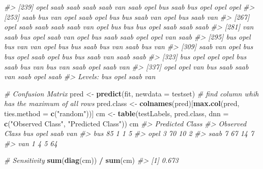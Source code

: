\documentclass[]{book}
\newenvironment{Shaded}{\begin{snugshade}}{\end{snugshade}}
\newcommand{\CommentTok}[1]{\textcolor[rgb]{0.56,0.35,0.01}{\textit{#1}}}
\newcommand{\DataTypeTok}[1]{\textcolor[rgb]{0.13,0.29,0.53}{#1}}
\newcommand{\KeywordTok}[1]{\textcolor[rgb]{0.13,0.29,0.53}{\textbf{#1}}}
\newcommand{\NormalTok}[1]{#1}
\newcommand{\OperatorTok}[1]{\textcolor[rgb]{0.81,0.36,0.00}{\textbf{#1}}}
\newcommand{\StringTok}[1]{\textcolor[rgb]{0.31,0.60,0.02}{#1}}
\begin{document}
\begin{Shaded}
\begin{Highlighting}[]
\CommentTok{#> [239] opel saab saab saab saab van  saab opel bus  saab bus  opel opel opel}
\CommentTok{#> [253] saab bus  van  opel saab opel bus  bus  saab van  opel bus  saab van }
\CommentTok{#> [267] opel saab saab saab saab van  opel bus  bus  bus  opel saab saab saab}
\CommentTok{#> [281] van  saab bus  opel saab van  opel bus  saab saab opel opel van  saab}
\CommentTok{#> [295] bus  opel bus  van  van  opel bus  bus  saab bus  van  saab bus  van }
\CommentTok{#> [309] saab van  opel bus  bus  opel saab opel bus  bus  saab van  saab saab}
\CommentTok{#> [323] bus  opel opel opel bus  saab bus  van  bus  van  saab opel saab van }
\CommentTok{#> [337] opel opel van  bus  saab saab van  saab opel saab}
\CommentTok{#> Levels: bus opel saab van}
\end{Highlighting}
\end{Shaded}

\begin{Shaded}
\begin{Highlighting}[]
\CommentTok{# Confusion Matrix}
\NormalTok{pred <-}\StringTok{ }\KeywordTok{predict}\NormalTok{(fit, }\DataTypeTok{newdata =}\NormalTok{ testset)}
\CommentTok{# find column whih has the maximum of all rows }
\NormalTok{pred.class <-}\StringTok{ }\KeywordTok{colnames}\NormalTok{(pred)[}\KeywordTok{max.col}\NormalTok{(pred, }\DataTypeTok{ties.method =} \KeywordTok{c}\NormalTok{(}\StringTok{"random"}\NormalTok{))]}
\NormalTok{cm <-}\StringTok{ }\KeywordTok{table}\NormalTok{(testLabels, pred.class, }
      \DataTypeTok{dnn =} \KeywordTok{c}\NormalTok{(}\StringTok{"Observed Class"}\NormalTok{, }\StringTok{"Predicted Class"}\NormalTok{))}
\NormalTok{cm}
\CommentTok{#>               Predicted Class}
\CommentTok{#> Observed Class bus opel saab van}
\CommentTok{#>           bus   85    1    1   5}
\CommentTok{#>           opel   3   70   10   2}
\CommentTok{#>           saab   7   67   14   7}
\CommentTok{#>           van    1    4    5  64}
\end{Highlighting}
\end{Shaded}

\begin{Shaded}
\begin{Highlighting}[]
\CommentTok{# Sensitivity}
\KeywordTok{sum}\NormalTok{(}\KeywordTok{diag}\NormalTok{(cm)) }\OperatorTok{/}\StringTok{ }\KeywordTok{sum}\NormalTok{(cm)}
\CommentTok{#> [1] 0.673}
\end{Highlighting}
\end{Shaded}

\begin{Shaded}
\end{Shaded}
\end{document}
